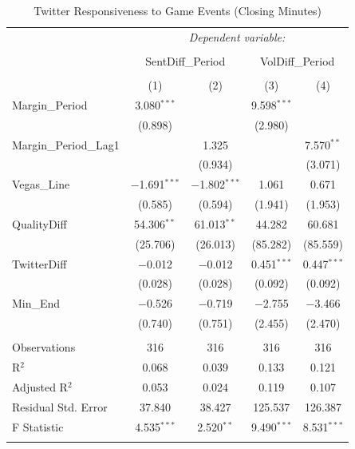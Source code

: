 \documentclass[12pt]{article}
\begin{document}
\begin{doublespacing}
\begin{table}[H] 
\centering 
\caption{Twitter Responsiveness to Game Events (Closing Minutes)} 
\label{} 
\begin{tabular*}{\textwidth}{@{\extracolsep{\fill}}lcccc} 
\hline 
\hline
 & \multicolumn{4}{c}{\textit{Dependent variable:}} \\ 
\cline{2-5} 
\\[-3.0ex] & \multicolumn{2}{c}{SentDiff\_Period} & \multicolumn{2}{c}{VolDiff\_Period} \\ 
\\[-1.5ex] & (1) & (2) & (3) & (4)\\ 
\hline
 Margin\_Period & 3.080$^{***}$ &  & 9.598$^{***}$ &  \\ 
  & (0.898) &  & (2.980) &  \\ 
 Margin\_Period\_Lag1 &  & 1.325 &  & 7.570$^{**}$ \\ 
  &  & (0.934) &  & (3.071) \\ 
 Vegas\_Line & $-$1.691$^{***}$ & $-$1.802$^{***}$ & 1.061 & 0.671 \\ 
  & (0.585) & (0.594) & (1.941) & (1.953) \\ 
 QualityDiff & 54.306$^{**}$ & 61.013$^{**}$ & 44.282 & 60.681 \\ 
  & (25.706) & (26.013) & (85.282) & (85.559) \\ 
 TwitterDiff & $-$0.012 & $-$0.012 & 0.451$^{***}$ & 0.447$^{***}$ \\ 
  & (0.028) & (0.028) & (0.092) & (0.092) \\ 
 Min\_End & $-$0.526 & $-$0.719 & $-$2.755 & $-$3.466 \\ 
  & (0.740) & (0.751) & (2.455) & (2.470) \\ 
\hline \\[-1.8ex] 
Observations & 316 & 316 & 316 & 316 \\ 
R$^{2}$ & 0.068 & 0.039 & 0.133 & 0.121 \\ 
Adjusted R$^{2}$ & 0.053 & 0.024 & 0.119 & 0.107 \\ 
Residual Std. Error & 37.840 & 38.427 & 125.537 & 126.387 \\ 
F Statistic & 4.535$^{***}$ & 2.520$^{**}$ & 9.490$^{***}$ & 8.531$^{***}$ \\ 
\hline 
\hline \\[-1.8ex] 
\end{tabular*} 
\end{table} 


\end{doublespacing}
\end{document}
